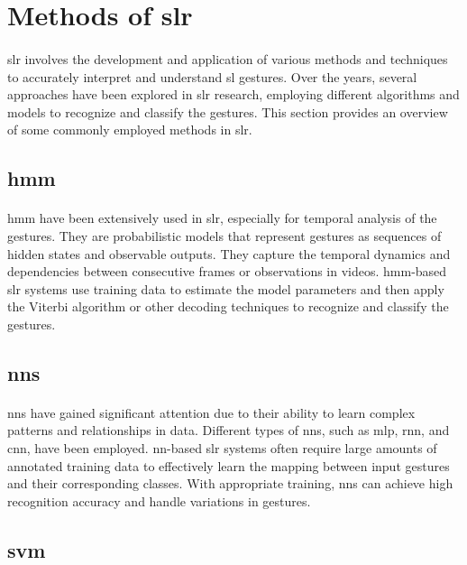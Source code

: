 \section{Methods of \ac{slr}}
\paragraph{}
\ac{slr} involves the development and application of various methods and techniques to accurately interpret and understand \ac{sl} gestures. Over the years, several approaches have been explored in \ac{slr} research, employing different algorithms and models to recognize and classify the gestures. This section provides an overview of some commonly employed methods in \ac{slr}.

\subsection{\ac{hmm}}
\paragraph{}
\ac{hmm} have been extensively used in \ac{slr}, especially for temporal analysis of the gestures. They are probabilistic models that represent gestures as sequences of hidden states and observable outputs. They capture the temporal dynamics and dependencies between consecutive frames or observations in videos. \ac{hmm}-based \ac{slr} systems use training data to estimate the model parameters and then apply the Viterbi algorithm or other decoding techniques to recognize and classify the gestures.

\subsection{\ac{nn}s}
\paragraph{}
\ac{nn}s have gained significant attention due to their ability to learn complex patterns and relationships in data. Different types of \ac{nn}s, such as \ac{mlp}, \ac{rnn}, and \ac{cnn}, have been employed. \ac{nn}-based \ac{slr} systems often require large amounts of annotated training data to effectively learn the mapping between input gestures and their corresponding classes. With appropriate training, \ac{nn}s can achieve high recognition accuracy and handle variations in gestures.

\subsection{\ac{svm} }
